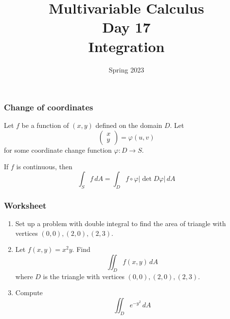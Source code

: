 \documentclass[aspectratio=169]{beamer}
\title{ Multivariable Calculus \\ Day  17\\ Integration }
\date{Spring 2023}
\begin{document}
\maketitle

\begin{frame}
    \frametitle{Change of coordinates}
    Let $f$ be a function of  $(x,y)$ defined on the domain $D$. 
    Let 
    \begin{equation*}
        \begin{pmatrix}
            x \\ y
        \end{pmatrix}
         = \varphi(u,v)
    \end{equation*}
    for some coordinate change function $\varphi: D \to S$.
    \begin{theorem}
        If $f$ is continuous, then
        \begin{equation*}
            \int_S f \, dA = \int_D f\circ \varphi |\det D \varphi| \, dA
        \end{equation*}
    \end{theorem}
\end{frame}

\begin{frame}
    \frametitle{Worksheet}
    \begin{enumerate}
        \item Set up a problem with double integral to find the area of triangle with vertices $(0,0), (2,0), (2,3)$.
        \item Let $f(x,y) = x^2y$. Find
            \begin{equation*}
                \iint_D f(x,y) \, dA
            \end{equation*}
            where $D$ is the triangle with vertices $(0,0), (2,0), (2,3)$.
        \item Compute 
            $$ \iint_D e^{-y^2} \, dA $$
    \end{enumerate}

\end{frame}
\end{document}
